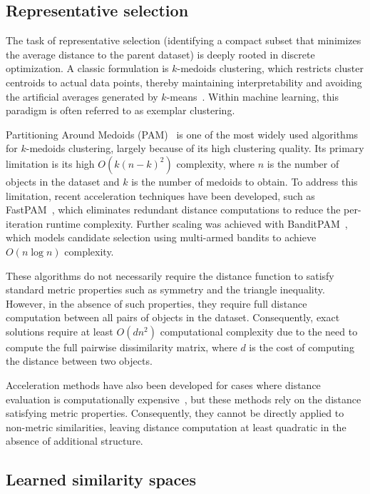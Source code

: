\documentclass{ieeeaccess}
\newcommand{\kmedoidstheory}{$k$-medoids\xspace}
\begin{document}
\subsection{Representative selection}

The task of representative selection (identifying a compact subset that minimizes the average distance to the parent dataset) is deeply rooted in discrete optimization. A classic formulation is \kmedoidstheory clustering, which restricts cluster centroids to actual data points, thereby maintaining interpretability and avoiding the artificial averages generated by $k$-means~\cite{kaufman1987clustering}. Within machine learning, this paradigm is often referred to as exemplar clustering.

Partitioning Around Medoids (PAM)~\cite{kaufman1987clustering} is one of the most widely used algorithms for \kmedoidstheory clustering, largely because of its high clustering quality. Its primary limitation is its high $O(k(n-k)^2)$ complexity, where $n$ is the number of objects in the dataset and $k$ is the number of medoids to obtain. To address this limitation, recent acceleration techniques have been developed, such as FastPAM~\cite{schubert2021fastPAM}, which eliminates redundant distance computations to reduce the per-iteration runtime complexity. Further scaling was achieved with BanditPAM~\cite{tiwari2020banditpam}, which models candidate selection using multi-armed bandits to achieve $O(n\log n)$ complexity.

These algorithms do not necessarily require the distance function to satisfy standard metric properties such as symmetry and the triangle inequality. However, in the absence of such properties, they require full distance computation between all pairs of objects in the dataset. Consequently, exact solutions require at least $O(dn^2)$ computational complexity due to the need to compute the full pairwise dissimilarity matrix, where $d$ is the cost of computing the distance between two objects.

Acceleration methods have also been developed for cases where distance evaluation is computationally expensive~\cite{Ganti1999ClusteringLD,Nanni2005Expensivemetrics}, but these methods rely on the distance satisfying metric properties. Consequently, they cannot be directly applied to non-metric similarities, leaving distance computation at least quadratic in the absence of additional structure.

\subsection{Learned similarity spaces}
\end{document}
